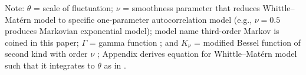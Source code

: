 \begin{table}[htb]
\begin{tabular}{p{} llp{}<{\centering}}
        \bottomrule
    \end{tabular}
    \begin{flushleft}
        Note: $\theta$ = scale of fluctuation; $\nu$ = smoothness parameter that reduces Whittle–Matérn model to specific one-parameter autocorrelation model (e.g., $\nu=0.5$ produces Markovian exponential model); model name third-order Markov is coined in this paper; $\Gamma$ = gamma function \citep{Abramowitz1970}; and $K_{\nu}$ = modified Bessel function of second kind with order $\nu$ \citep{Abramowitz1970}; Appendix derives equation for Whittle–Matérn model such that it integrates to $\theta$ as in .
    \end{flushleft}
    
\end{table}